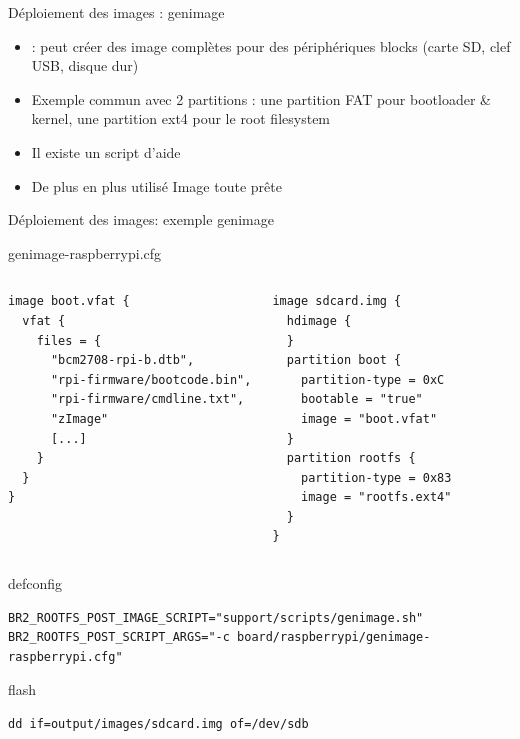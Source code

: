 \documentclass[aspectratio=169,obeyspaces,spaces,hyphens,dvipsnames]{beamer}
\begin{document}
\begin{frame}{Déploiement des images : genimage}
  \begin{itemize}
  \item {} : peut créer des image complètes pour des périphériques
    blocks (carte SD, clef USB, disque dur)
  \item Exemple commun avec 2 partitions : une partition FAT
    pour bootloader \& kernel, une partition ext4 pour le root filesystem
  \item Il existe un script d'aide 
  \item De plus en plus utilisé \MVRightarrow Image toute prête
  \end{itemize}
\end{frame}

\begin{frame}[fragile]{Déploiement des images: exemple genimage}
\begin{block}{genimage-raspberrypi.cfg}
\begin{columns}
{\tiny
  \begin{verbatim}
image boot.vfat {
  vfat {
    files = {
      "bcm2708-rpi-b.dtb",
      "rpi-firmware/bootcode.bin",
      "rpi-firmware/cmdline.txt",
      "zImage"
      [...]
    }
  }
}
\end{verbatim}
}
{\tiny
\begin{verbatim}
image sdcard.img {
  hdimage {
  }
  partition boot {
    partition-type = 0xC
    bootable = "true"
    image = "boot.vfat"
  }
  partition rootfs {
    partition-type = 0x83
    image = "rootfs.ext4"
  }
}
 \end{verbatim}
}
\end{columns}
\end{block}
\begin{block}{defconfig}
{\tiny
  \begin{verbatim}
BR2_ROOTFS_POST_IMAGE_SCRIPT="support/scripts/genimage.sh"
BR2_ROOTFS_POST_SCRIPT_ARGS="-c board/raspberrypi/genimage-raspberrypi.cfg"
\end{verbatim}
}
\end{block}
\begin{block}{flash}
{\tiny
  \begin{verbatim}
dd if=output/images/sdcard.img of=/dev/sdb
\end{verbatim}
}
\end{block}
\end{frame}
\end{document}
